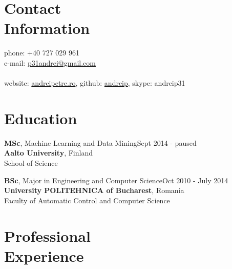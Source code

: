 \documentclass[margin,line]{resume}
\begin{document}
\begin{resume}

    \section{\mysidestyle Contact\\Information}

    phone: +40 727 029 961              \\
    e-mail:  \href{mailto:p31andrei@gmail.com}{p31andrei@gmail.com}  \vspace{0mm}\\\vspace{-4.5mm}\\%
    website: \href{http://andreipetre.ro}{andreipetre.ro}, github: \href{https://github.com/andreip/}{andreip}, skype: andreip31

    \section{\mysidestyle Education}

    \textbf{MSc}, Machine Learning and Data Mining\hfill Sept 2014 - paused\\
    \textbf{Aalto University}, Finland\\
    School of Science

    \textbf{BSc}, Major in Engineering and Computer Science\hfill Oct 2010 - July 2014\\
    \textbf{University POLITEHNICA of Bucharest}, Romania\\
    Faculty of Automatic Control and Computer Science

    \section{\mysidestyle Professional\\Experience}


\end{resume}
\end{document}
